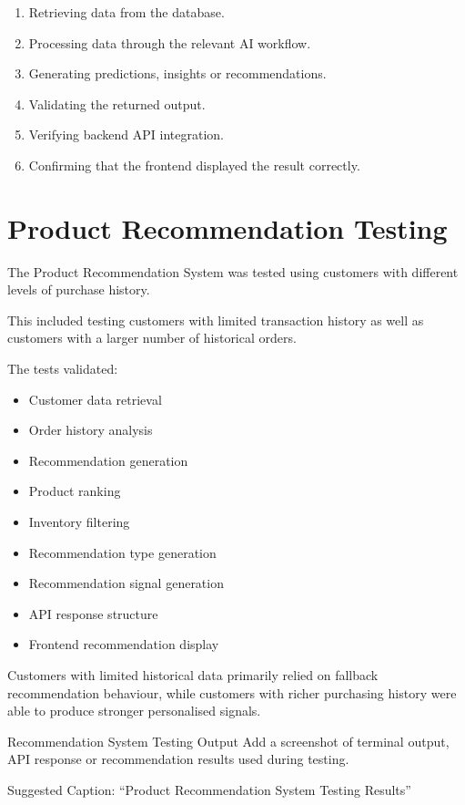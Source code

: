 \documentclass[12pt,a4paper]{report}
\begin{document}
\begin{enumerate}
    \item Retrieving data from the database.
    \item Processing data through the relevant AI workflow.
    \item Generating predictions, insights or recommendations.
    \item Validating the returned output.
    \item Verifying backend API integration.
    \item Confirming that the frontend displayed the result correctly.
\end{enumerate}



\section{Product Recommendation Testing}

The Product Recommendation System was tested using customers with
different levels of purchase history.

This included testing customers with limited transaction history as well
as customers with a larger number of historical orders.

The tests validated:

\begin{itemize}
    \item Customer data retrieval
    \item Order history analysis
    \item Recommendation generation
    \item Product ranking
    \item Inventory filtering
    \item Recommendation type generation
    \item Recommendation signal generation
    \item API response structure
    \item Frontend recommendation display
\end{itemize}

Customers with limited historical data primarily relied on fallback
recommendation behaviour, while customers with richer purchasing
history were able to produce stronger personalised signals.

\begin{screenshotplaceholder}{Recommendation System Testing Output}
Add a screenshot of terminal output, API response or recommendation
results used during testing.

Suggested Caption: ``Product Recommendation System Testing Results''
\end{screenshotplaceholder}
\end{document}
